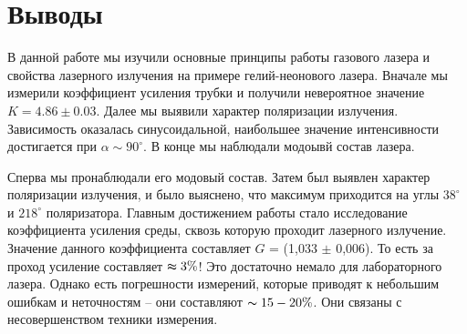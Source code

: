 \documentclass[a4paper,12pt]{article}
\begin{document}
\section{Выводы}
В данной работе мы изучили основные принципы работы газового лазера и свойства лазерного излучения на примере гелий-неонового лазера. Вначале мы измерили коэффициент усиления трубки и получили невероятное значение $K = 4.86\pm0.03$. Далее мы выявили характер поляризации излучения. Зависимость оказалась синусоидальной, наибольшее значение интенсивности достигается при $\alpha\sim 90^\circ$. В конце мы наблюдали модоывй состав лазера.


Сперва мы пронаблюдали его модовый состав. Затем был выявлен характер поляризации излучения, и было выяснено, что максимум приходится на углы $38^\circ$ и $218^\circ$ поляризатора. Главным достижением работы стало исследование коэффициента усиления среды, сквозь которую проходит лазерного излучение. Значение данного коэффициента составляет $G$ = (1,033 $\pm$ 0,006). То есть за проход усиление составляет $\thickapprox 3\%$! Это достаточно немало для лабораторного лазера. Однако есть погрешности измерений, которые приводят к небольшим ошибкам и неточностям -- они составляют $\thicksim 15-20\%$. Они связаны с несовершенством техники измерения. 
\end{document}
